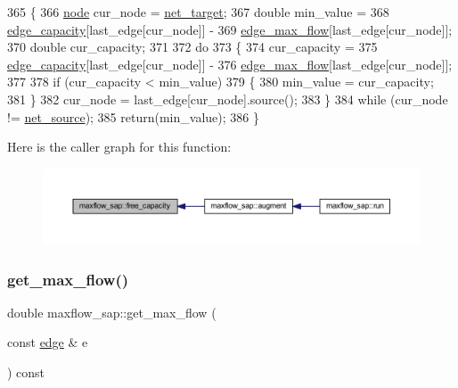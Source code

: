 \begin{DoxyCode}
365 \{
366     \mbox{\hyperlink{classnode}{node}} cur\_node = \mbox{\hyperlink{classmaxflow__sap_a8d0e8f448ed29a1329a70c8f4f496c2c}{net\_target}};
367     \textcolor{keywordtype}{double} min\_value = 
368         \mbox{\hyperlink{classmaxflow__sap_acfa95eef5ea5bf7814c4dabd3994bc63}{edge\_capacity}}[last\_edge[cur\_node]] -
369         \mbox{\hyperlink{classmaxflow__sap_a25820db833a98efc69fc3edb79fc49d3}{edge\_max\_flow}}[last\_edge[cur\_node]];
370     \textcolor{keywordtype}{double} cur\_capacity;
371 
372     \textcolor{keywordflow}{do}
373     \{
374         cur\_capacity = 
375             \mbox{\hyperlink{classmaxflow__sap_acfa95eef5ea5bf7814c4dabd3994bc63}{edge\_capacity}}[last\_edge[cur\_node]] -
376             \mbox{\hyperlink{classmaxflow__sap_a25820db833a98efc69fc3edb79fc49d3}{edge\_max\_flow}}[last\_edge[cur\_node]];
377 
378         \textcolor{keywordflow}{if} (cur\_capacity < min\_value)
379         \{
380             min\_value = cur\_capacity;
381         \}
382         cur\_node = last\_edge[cur\_node].source();
383     \}
384     \textcolor{keywordflow}{while} (cur\_node != \mbox{\hyperlink{classmaxflow__sap_abd4266c76dbd73f7f719d3a4fba2655d}{net\_source}});
385     \textcolor{keywordflow}{return}(min\_value);
386 \}
\end{DoxyCode}
Here is the caller graph for this function\+:\nopagebreak
\begin{figure}[H]
\begin{center}
\leavevmode
\includegraphics[width=350pt]{classmaxflow__sap_abd2935db387f32891228291a52d6ad45_icgraph}
\end{center}
\end{figure}
\mbox{\label{classmaxflow__sap_ae90889b16323a2af0ab13e04c87953a5}} 
\subsubsection{\texorpdfstring{get\+\_\+max\+\_\+flow()}{get\_max\_flow()}\hspace{0.1cm}{\footnotesize\ttfamily [1/2]}}
{\footnotesize\ttfamily double maxflow\+\_\+sap\+::get\+\_\+max\+\_\+flow (\begin{DoxyParamCaption}\item[{const \mbox{\hyperlink{classedge}{edge}} \&}]{e }\end{DoxyParamCaption}) const}

